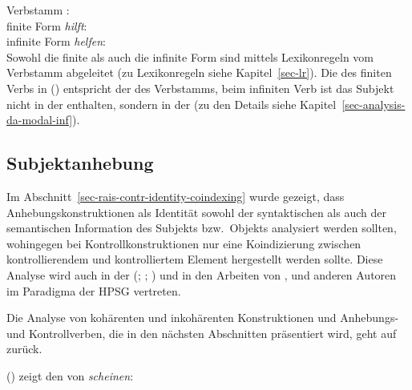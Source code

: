 {
\ea
Verbstamm :\\
\z 
\ea
finite Form \emph{hilft}:\\
\z 
\ea
infinite Form \emph{helfen}:\\
\z
Sowohl die finite als auch die infinite Form sind mittels Lexikonregeln vom Verbstamm abgeleitet
(zu Lexikonregeln siehe Kapitel~\ref{sec-lr}). Die \compsl des finiten Verbs in () entspricht der \compsl
des Verbstamms, beim infiniten Verb ist das Subjekt nicht in der \compsl enthalten, sondern in der
\subjl (zu den Details siehe Kapitel~\ref{sec-analysis-da-modal-inf}).


\subsection{Subjektanhebung}
\label{sec-subjektanhebung-anal}

Im Abschnitt~\ref{sec-rais-contr-identity-coindexing} wurde gezeigt,
dass Anhebungskonstruktionen als Identität sowohl der syntaktischen
als auch der semantischen Information des Subjekts bzw.\ Objekts analysiert werden
sollten, wohingegen bei Kontrollkonstruktionen nur eine Koindizierung
zwischen kontrollierendem und kontrolliertem Element hergestellt werden sollte.
Diese Analyse wird auch in der \lfg
(\citealp{Andrews82b}; \citealp{Neidle82a}; \citealp[]{Bresnan82c})
und in den Arbeiten von \citet[Kapitel~7]{ps2}, \citet{Kiss95a}
und anderen Autoren im Paradigma der HPSG vertreten.

Die Analyse von kohärenten und inkohärenten Konstruktionen und Anhebungs- und
Kontrollverben, die in den nächsten Abschnitten präsentiert wird,
geht auf \citet{Kiss95a} zurück. 

() zeigt den \locw von \emph{scheinen}:

}
